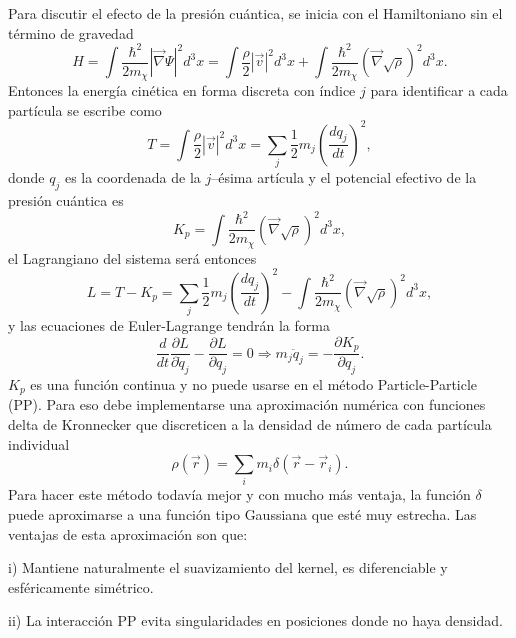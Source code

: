 \documentclass[a4paper,openright,12pt]{book}
\begin{document}
Para discutir el efecto de la presión cuántica, se inicia con el Hamiltoniano sin el término de gravedad
\begin{equation}
H = \int \frac{\hbar^{2}}{2 m_{\chi}} |\vec{\nabla}\Psi|^{2}d^{3}x
  = \int \frac{\rho}{2} |\vec{v}|^{2}d^{3}x + \int \frac{\hbar^{2}}{2 m_{\chi}} (\vec{\nabla}\sqrt{\rho})^{2}d^{3}x.\label{eqn 3.8}
\end{equation}
Entonces la energía cinética en forma discreta con índice $j$ para identificar a cada partícula se escribe como
\begin{equation}
T = \int \frac{\rho}{2} |\vec{v}|^{2}d^{3}x = \sum_{j} \frac{1}{2} m_{j} \left(\frac{d q_{j}}{dt}\right)^{2}, \label{eqn 3.9}
\end{equation}
donde $q_{j}$ es la coordenada de la $j$--ésima artícula y el potencial efectivo de la presión cuántica es 
\begin{equation}
K_{p} = \int \frac{\hbar^{2}}{2 m_{\chi}} (\vec{\nabla}\sqrt{\rho})^{2}d^{3}x, \label{eqn 3.10}
\end{equation}
el Lagrangiano del sistema será entonces 
\begin{equation}
L = T - K_{p}
  =
\sum_{j} \frac{1}{2} m_{j} \left(\frac{d q_{j}}{dt}\right)^{2}
-
 \int \frac{\hbar^{2}}{2 m_{\chi}} (\vec{\nabla}\sqrt{\rho})^{2}d^{3}x,\label{eqn 3.11}  
\end{equation}
y las ecuaciones de Euler-Lagrange tendrán la forma
\begin{equation}
\frac{d}{dt}\frac{\partial L}{\partial \dot{q}_{j}} - \frac{\partial L }{\partial q_{j}} = 0 
\Rightarrow 
m_{j} \ddot{q}_{j} = - \frac{\partial K_{p}}{\partial q_{j}}.\label{eqn 3.12}
\end{equation}
$K_{p}$ es una función continua y no puede usarse en el método Particle-Particle (PP). Para eso debe implementarse una aproximación numérica con funciones delta de Kronnecker que discreticen a la densidad de número de cada partícula individual
\begin{equation}
\rho(\vec{r})
=
\sum_{i}m_{i}\delta(\vec{r}-\vec{r}_{i}).\label{eqn 3.13}
\end{equation}
Para hacer este método todavía mejor y con mucho más ventaja, la función $\delta$ puede aproximarse a una función tipo Gaussiana que esté muy estrecha. Las ventajas de esta aproximación son que:

i) Mantiene naturalmente el suavizamiento del kernel, es diferenciable y esféricamente simétrico.

ii) La interacción PP evita singularidades en posiciones donde no haya densidad.
\end{document}
